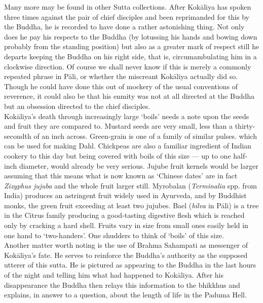 Many more may be found in other Sutta collections. After Kok\=aliya has spoken three times against the pair of chief disciples and been reprimanded for this by the Buddha, he is recorded to have done a rather astonishing thing. Not only does he pay his respects to the Buddha (by lotussing his hands and bowing down probably from the standing position) but also as a greater mark of respect still he departs keeping the Buddha on his right side, that is, circumambulating him in a clockwise direction. Of course we shall never know if this is merely a commonly repeated phrase in P\=ali, or whether the miscreant Kok\=aliya actually did so. Though he could have done this out of mockery of the usual conventions of reverence, it could also be that his enmity was not at all directed at the Buddha but an obsession directed to the chief disciples.\\

Kok\=aliya's death through increasingly large `boils' needs a note upon the seeds and fruit they are compared to. Mustard seeds are very small, less than a thirty-secondth of an inch across. Green-grain is one of a family of similar pulses. which can be used for making Dahl. Chickpeas are also a familiar ingredient of Indian cookery to this day but being covered with boils of this size — up to one half-inch diameter, would already be very serious. Jujube fruit kernels would be larger assuming that this means what is now known as `Chinese dates' are in fact \textit{Zizyphus jujuba} and the whole fruit larger still. Myrobalan (\textit{Terminalia} spp. from India) produces an astringent fruit widely used in Ayurveda, and by Buddhist monks, the green fruit exceeding at least two jujubes. Bael (\textit{bilva} in P\=ali) is a tree in the Citrus family producing a good-tasting digestive flesh which is reached only by cracking a hard shell. Fruits vary in size from small ones easily held in one hand to `two-handers'. One shudders to think of `boils' of this size.\\

Another matter worth noting is the use of Brahma Sahampati as messenger of Kok\=aliya's fate. He serves to reinforce the Buddha's authority as the supposed utterer of this sutta. He is pictured as appearing to the Buddha in the last hours of the night and telling him what had happened to Kok\=aliya. After his disappearance the Buddha then relays this information to the bhikkhus and explains, in answer to a question, about the length of life in the Paduma Hell.\\

